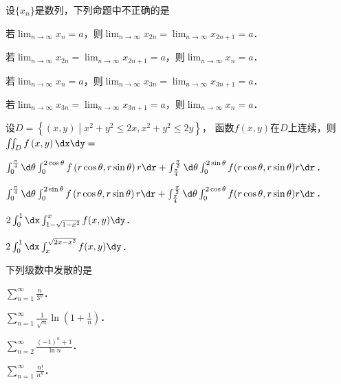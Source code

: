 \documentclass[plain,noanswer,medmath]{../../template/jnuexam}
\begin{document}






\begin{problem}
设$\{x_n\}$是数列，下列命题中不正确的是\pickout{}
\begin{abcd}
\item 若$\lim_{n\to\infty} x_n = a$，则$\lim_{n\to\infty} x_{2n} = \lim_{n \to \infty} x_{2n + 1} = a$．
\item 若$\lim_{n\to\infty} x_{2n} = \lim_{n\to\infty} x_{2n + 1} = a$，则$\lim_{n \to \infty} x_n = a$．
\item 若$\lim_{n\to\infty} x_n = a$，则$\lim_{n\to\infty} x_{3n} = \lim_{n \to \infty} x_{3n + 1} = a$．
\item 若$\lim_{n\to\infty} x_{3n} = \lim_{n\to\infty} x_{3n + 1} = a$，则$\lim_{n \to \infty} x_n = a$．
\end{abcd}
\end{problem}




\begin{problem}
设$D = \left\{(x,y) \middle| x^2 + y^2 \le 2x, x^2 + y^2 \le 2y \right\}$，
函数$f\left(x,y \right)$在$D$上连续，\goodbreak 则$\iint_D f\left(x,y \right)\dx\dy =$\pickout{}
\begin{abcd}
\item $\int_0^{\frac{\pi}{4}} \d\theta \int_0^{2\cos \theta} f\left(r\cos \theta ,r\sin \theta \right) r\dr 
 + \int_{\frac{\pi}{4}}^{\frac{\pi}{2}}\d\theta \int_0^{2\sin\theta}f(r\cos\theta,r\sin\theta)r\dr$．
\item $\int_0^{\frac{\pi}{4}} \d\theta \int_0^{2\sin \theta} f\left(r\cos \theta ,r\sin \theta \right) r\dr 
 + \int_{\frac{\pi}{4}}^{\frac{\pi}{2}} \d\theta \int_0^{2\cos \theta} f(r\cos\theta,r\sin\theta) r\dr$．
\item $2\int_0^1 \dx \int_{1 - \sqrt{1 - x^2}}^x f(x,y)\dy$．
\item $2\int_0^1 \dx \int_x^{\sqrt{2x - x^2}} f(x,y)\dy$．
\end{abcd}
\end{problem}


\begin{problem}
下列级数中发散的是\pickout{}
\begin{abcd}
\item $\sum_{n = 1}^{\infty}\frac{n}{3^n}$．
\item $\sum_{n = 1}^{\infty}\frac{1}{\sqrt{n}}\ln \left(1 + \frac{1}{n} \right)$．
\item $\sum_{n = 2}^{\infty}\frac{(- 1)^n + 1}{\ln n}$．
\item $\sum_{n = 1}^{\infty}\frac{n!}{n^n}$．
\end{abcd}
\end{problem}
\end{document}
